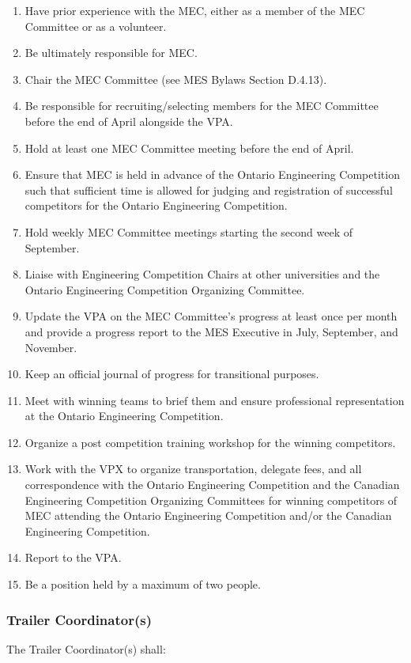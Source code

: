 \begin{enumerate}
 \item
  Have prior experience with the MEC, either as a member of the MEC
  Committee or as a volunteer.
 \item
  Be ultimately responsible for MEC.
 \item
  Chair the MEC Committee (see MES Bylaws Section D.4.13).
 \item
  Be responsible for recruiting/selecting members for the MEC Committee
  before the end of April alongside the VPA.
 \item
  Hold at least one MEC Committee meeting before the end of April.
 \item
  Ensure that MEC is held in advance of the Ontario Engineering
  Competition such that sufficient time is allowed for judging and
  registration of successful competitors for the Ontario Engineering
  Competition.
 \item
  Hold weekly MEC Committee meetings starting the second week of
  September.
 \item
  Liaise with Engineering Competition Chairs at other universities and
  the Ontario Engineering Competition Organizing Committee.
 \item
  Update the VPA on the MEC Committee's progress at least once per month
  and provide a progress report to the MES Executive in July, September,
  and November.
 \item
  Keep an official journal of progress for transitional purposes.
 \item
  Meet with winning teams to brief them and ensure professional
  representation at the Ontario Engineering Competition.
 \item
  Organize a post competition training workshop for the winning
  competitors.
 \item
  Work with the VPX to organize transportation, delegate fees, and all
  correspondence with the Ontario Engineering Competition and the
  Canadian Engineering Competition Organizing Committees for winning
  competitors of MEC attending the Ontario Engineering Competition
  and/or the Canadian Engineering Competition.
 \item
  Report to the VPA.
 \item
  Be a position held by a maximum of two people.

\end{enumerate}

\hypertarget{trailer-coordinators}{%
 \subsubsection{Trailer Coordinator(s)}
 \label{trailer-coordinators}}
The Trailer Coordinator(s) shall:

